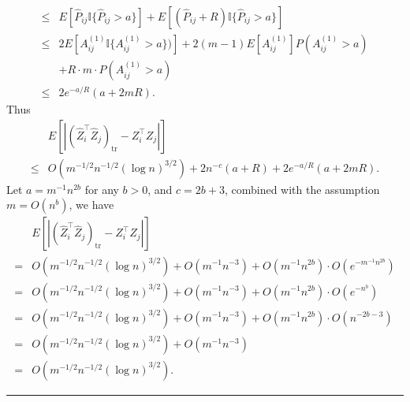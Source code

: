 \documentclass[a4paper]{article}
\newenvironment{proof}{{\bf Proof:  }}{\hfill\rule{2mm}{2mm}}
\renewcommand{\hat}{\widehat}
\begin{document}
\begin{proof}
\begin{align*}
	\le & E[\hat{P}_{ij} \mathbb{I}\{\hat{P}_{ij} > a\}] + E[(\hat{P}_{ij} + R) \mathbb{I}\{\hat{P}_{ij} > a\}] \\
	\le & 2 E[A_{ij}^{(1)} \mathbb{I} \{ A_{ij}^{(1)} > a \})] + 2(m-1) E[A_{ij}^{(1)}] P(A_{ij}^{(1)} > a) \\
	& + R \cdot m \cdot P(A_{ij}^{(1)} > a) \\
	\le & 2 e^{-a/R} (a + 2 m R).
\end{align*}
Thus
\begin{align*}
	& E[|(\hat{Z}_i^{\top} \hat{Z}_j)_{\mathrm{tr}} - Z_i^{\top} Z_j|] \\
	\le & O(m^{-1/2} n^{-1/2} (\log n)^{3/2}) + 2 n^{-c} (a + R) + 2 e^{-a/R} (a + 2 m R).
\end{align*}
Let $a = m^{-1} n^{2b}$ for any $b > 0$, and $c = 2b + 3$, combined with the assumption $m = O(n^{b})$, we have
\begin{align*}
	& E[|(\hat{Z}_i^{\top} \hat{Z}_j)_{\mathrm{tr}} - Z_i^{\top} Z_j|] \\
	= & O(m^{-1/2} n^{-1/2} (\log n)^{3/2}) + O(m^{-1} n^{-3}) + O(m^{-1} n^{2b}) \cdot O(e^{-m^{-1} n^{2b}}) \\
	= & O(m^{-1/2} n^{-1/2} (\log n)^{3/2}) + O(m^{-1} n^{-3}) + O(m^{-1} n^{2b}) \cdot O(e^{- n^{b}}) \\
	= & O(m^{-1/2} n^{-1/2} (\log n)^{3/2}) + O(m^{-1} n^{-3}) + O(m^{-1} n^{2b}) \cdot O(n^{-2b-3}) \\
	= & O(m^{-1/2} n^{-1/2} (\log n)^{3/2}) + O(m^{-1} n^{-3}) \\
	= & O(m^{-1/2} n^{-1/2} (\log n)^{3/2}).
\end{align*}
\end{proof}
\end{document}
